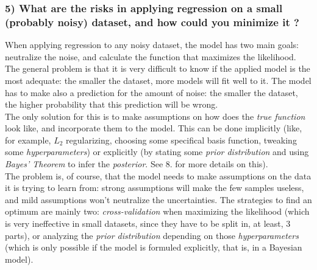 \documentclass[11pt]{scrartcl} %
\begin{document}
         \subsubsection*{5) What are the risks in applying regression on a small (probably noisy) dataset, and how could you minimize it ?}
         When applying regression to any noisy dataset, the model has two main goals: neutralize the noise, and calculate the function that maximizes the likelihood. The general problem is that it is very difficult to know if the applied model is the most adequate: the smaller the dataset, more models will fit well to it. The model has to make also a prediction for the amount of noise: the smaller the dataset, the higher probability that this prediction will be wrong.\\
         The only solution for this is to make assumptions on how does the {\it true function} look like, and incorporate them to the model. This can be done implicitly (like, for example, \(L_2\) regularizing, choosing some specifical basis function, tweaking some {\it hyperparameters}) or explicitly (by stating some {\it prior distribution} and using {\it Bayes' Theorem} to infer the {\it posterior}. See 8. for more details on this).\\
         The problem is, of course, that the model needs to make assumptions on the data it is trying to learn from: strong assumptions will make the few samples useless, and mild assumptions won't neutralize the uncertainties. The strategies to find an optimum are mainly two: {\it cross-validation} when maximizing the likelihood (which is very ineffective in small datasets, since they have to be split in, at least, 3 parts), or analyzing the {\it prior distribution} depending on those {\it hyperparameters} (which is only possible if the model is formuled explicitly, that is, in a Bayesian model).
\end{document}
